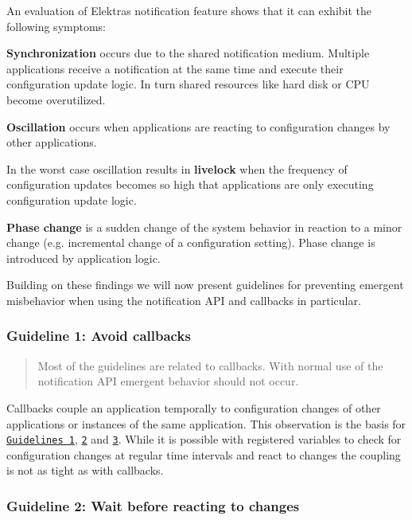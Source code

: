 An evaluation of Elektra\textquotesingle{}s notification feature shows that it can exhibit the following symptoms\+:


\begin{DoxyItemize}
\item {\bfseries Synchronization} occurs due to the shared notification medium. Multiple applications receive a notification at the same time and execute their configuration update logic. In turn shared resources like hard disk or C\+PU become overutilized.
\item {\bfseries Oscillation} occurs when applications are reacting to configuration changes by other applications.
\item In the worst case oscillation results in {\bfseries livelock} when the frequency of configuration updates becomes so high that applications are only executing configuration update logic.
\item {\bfseries Phase change} is a sudden change of the system behavior in reaction to a minor change (e.\+g. incremental change of a configuration setting). Phase change is introduced by application logic.
\end{DoxyItemize}

Building on these findings we will now present guidelines for preventing emergent misbehavior when using the notification A\+PI and callbacks in particular.

\subsubsection*{Guideline 1\+: Avoid callbacks}

\begin{quote}
Most of the guidelines are related to callbacks. With normal use of the notification A\+PI emergent behavior should not occur. \end{quote}


Callbacks couple an application temporally to configuration changes of other applications or instances of the same application. This observation is the basis for \href{#guideline-1-avoid-callbacks}{\tt Guidelines 1}, \href{#guideline-2-wait-before-reacting-to-changes}{\tt 2} and \href{#guideline-3-avoid-updates-as-reaction-to-change}{\tt 3}. While it is possible with registered variables to check for configuration changes at regular time intervals and react to changes the coupling is not as tight as with callbacks.

\subsubsection*{Guideline 2\+: Wait before reacting to changes}

